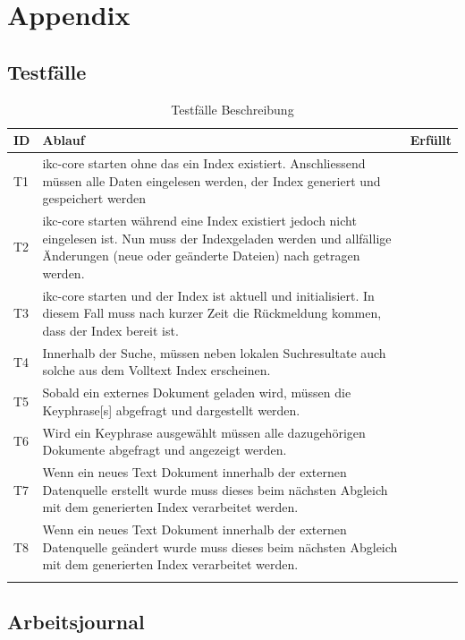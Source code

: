 \chapter{Appendix}

\section{Testfälle} \label{tests}

\begin{longtable}{|p{1cm} | p{10cm} |p{1.2cm}|}
  \hline
    ID & Ablauf & Erfüllt \\\hline
    T1 & \gls{ikc-core} starten ohne das ein Index existiert. Anschliessend müssen alle Daten eingelesen werden, der Index generiert und gespeichert werden& \\\hline
    T2 & \gls{ikc-core} starten während eine Index existiert jedoch nicht eingelesen ist. Nun muss der Indexgeladen werden und allfällige Änderungen (neue oder geänderte Dateien) nach getragen werden.&\\\hline
    T3 & \gls{ikc-core} starten und der Index ist aktuell und initialisiert. In diesem Fall muss nach kurzer Zeit die Rückmeldung kommen, dass der Index bereit ist.&\\\hline
    T4 & Innerhalb der Suche, müssen neben lokalen Suchresultate auch solche aus dem Volltext Index erscheinen. &\\\hline
    T5 & Sobald ein externes Dokument geladen wird, müssen die \gls{Keyphrase}[s] abgefragt und dargestellt werden.&\\\hline
    T6 & Wird ein \gls{Keyphrase} ausgewählt müssen alle dazugehörigen Dokumente abgefragt und angezeigt werden.&\\\hline
    T7 & Wenn ein neues Text Dokument innerhalb der externen Datenquelle erstellt wurde muss dieses beim nächsten Abgleich mit dem generierten Index verarbeitet werden.&\\\hline
    T8 & Wenn ein neues Text Dokument innerhalb der externen Datenquelle geändert wurde muss dieses beim nächsten Abgleich mit dem generierten Index verarbeitet werden.&\\\hline
    \caption{Testfälle Beschreibung}
  \label{tab:testkonzept-detail}
\end{longtable}



\section{Arbeitsjournal}
\label{arbeitsjournal}

